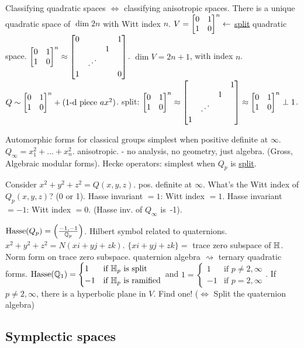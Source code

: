 \documentclass[]{article}
\begin{document}
Classifying quadratic spaces $\iff$ classifying anisotropic spaces. There is a unique quadratic space of $\dim 2n$ with Witt index $n$. $V = \begin{bmatrix}0&1\\1&0\end{bmatrix}^n \leftarrow$ \ul{split} quadratic space. $\mat{0&1\\1&0}^n \approx \mat{0 &&&1\\&&1&\\&\text{\reflectbox{$\ddots$}}&&\\1&&&0}$.
$\dim V = 2n+1$, with index $n$. $Q \sim \begin{bmatrix}0&1\\1&0\end{bmatrix}^n + (\text{1-d piece }ax^2)$. split: $\mat{0&1\\1&0}^n \approx \mat{ &&&1\\&&1&\\&\text{\reflectbox{$\ddots$}}&&\\1&&&} \approx \mat{0&1\\1&0}^n \perp {1}$.

Automorphic forms for classical groups simplest when positive definite at $\infty$. $Q_\infty = x_1^2 + \dots + x_n^2$. anisotropic. - no analysis, no geometry, just algebra. (Gross, Algebraic modular forms). Hecke operators: simplest when $Q_p$ is \ul{split}.

Consider $x^2+y^2+z^2 = Q(x,y,z)$. pos. definite at $\infty$. What's the Witt index of $Q_p(x,y,z)$? (0 or 1). Hasse invariant $ = 1$: Witt index $ = 1$. Hasse invariant $ = -1$: Witt index $ = 0$. (Hasse inv. of $Q_\infty$ is~-1).

$\text{Hasse}(Q_p) = \left(\frac{-1,-1}{\mathbb{Q}_p}\right)$. Hilbert symbol related to quaternions. $x^2+y^2+z^2 = N(xi+yj+zk)$. $\{xi+yj+zk\} = $ trace zero subspace of $\mathbb{H}$. Norm form on trace zero subspace. quaternion algebra $\rightsquigarrow$ ternary quadratic forms. $\text{Hasse}(\mathbb{Q}_1) = \begin{cases} 1 & \text{if } \mathbb{H}_p \text{ is split} \\ -1 & \text{if } \mathbb{H}_p \text{ is ramified} \end{cases}$ and $1 = \begin{cases} 1 & \text{if } p\neq 2,\infty \\ -1 & \text{if } p = 2,\infty \end{cases}$. 
If $p\neq 2,\infty$, there is a hyperbolic plane in $V$. Find one! 
($\iff$ Split the quaternion algebra)

\subsection*{Symplectic spaces}
\end{document}
